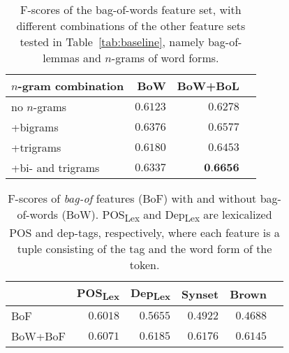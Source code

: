 \documentclass[11pt,letterpaper]{article}
\begin{document}
\begin{table}
  \begin{smaller}
    \begin{center}
      \begin{tabular}{lrrr}
        \toprule
      
        $n$-gram combination & BoW & BoW+BoL \\
        \midrule
        no $n$-grams & $0.6123$ & $0.6278$ \\
        +bigrams & $0.6376$ & $0.6577$ \\
        +trigrams & $0.6180$ & $0.6453$ \\
        +bi- and trigrams & $0.6337$ & $\textbf{0.6656}$ \\
        \bottomrule

      \end{tabular}
    \end{center}
    \caption{F-scores of the bag-of-words feature set, with different
      combinations of the other feature sets tested in Table~\ref{tab:baseline}, namely bag-of-lemmas and $n$-grams of word forms.}
    \label{tab:ngrams}
  \end{smaller}
\end{table}

\begin{table}
  \begin{smaller}    
  \begin{center}
    \begin{tabular}{lrrrrr}
      \toprule
      
     & POS\textsubscript{Lex} & Dep\textsubscript{Lex} & Synset & Brown\\ %
      \midrule
      BoF & $0.6018$ & $0.5655$ & $0.4922$ & $0.4688$ \\ %
      BoW+BoF & $0.6071$ & $0.6185$ & $0.6176$ & $0.6145$\\ %
      
      \bottomrule

    \end{tabular}
  \end{center}
  \caption{F-scores of \emph{bag-of} features (BoF) with and without bag-of-words (BoW). POS\textsubscript{Lex} and Dep\textsubscript{Lex} are lexicalized POS and dep-tags, respectively, where each feature is a tuple consisting of the tag and the word form of the token.}
  \label{tab:bagOfFeatures}
  \end{smaller}
\end{table}
\end{document}
